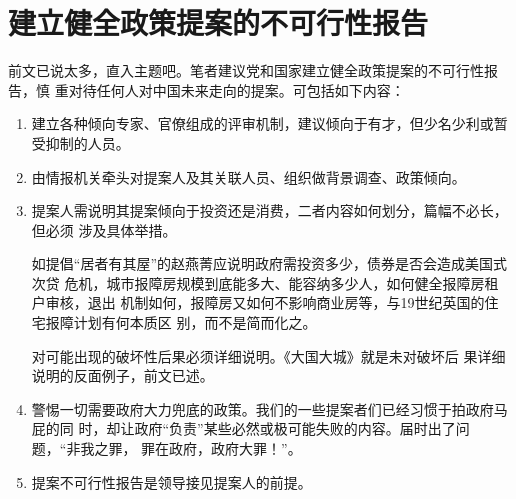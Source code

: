 




\section{建立健全政策提案的不可行性报告}

前文已说太多，直入主题吧。笔者建议党和国家建立健全政策提案的不可行性报告，慎
重对待任何人对中国未来走向的提案。可包括如下内容：
\begin{enumerate}
\item 建立各种倾向专家、官僚组成的评审机制，建议倾向于有才，但少名少利或暂受抑制的人员。

\item 由情报机关牵头对提案人及其关联人员、组织做背景调查、政策倾向。

\item 提案人需说明其提案倾向于投资还是消费，二者内容如何划分，篇幅不必长，但必须
  涉及具体举措。

  如提倡“居者有其屋”的赵燕菁应说明政府需投资多少，债券是否会造成美国式次贷
  危机，城市报障房规模到底能多大、能容纳多少人，如何健全报障房租户审核，退出
  机制如何，报障房又如何不影响商业房等，与19世纪英国的住宅报障计划有何本质区
  别，而不是简而化之。

  对可能出现的破坏性后果必须详细说明。《大国大城》就是未对破坏后
  果详细说明的反面例子，前文已述。

\item 警惕一切需要政府大力兜底的政策。我们的一些提案者们已经习惯于拍政府马屁的同
  时，却让政府“负责”某些必然或极可能失败的内容。届时出了问题，“非我之罪，
  罪在政府，政府大罪！”。

\item 提案不可行性报告是领导接见提案人的前提。
\end{enumerate}

